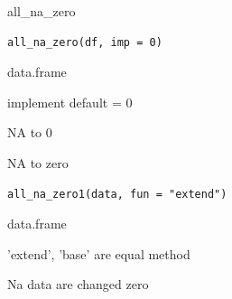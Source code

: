 \documentclass[a4paper]{book}
\begin{document}
%
\begin{Description}
all\_na\_zero
\end{Description}
%
\begin{Usage}
\begin{verbatim}
all_na_zero(df, imp = 0)
\end{verbatim}
\end{Usage}
%
\begin{Arguments}
\begin{ldescription}
\item[\code{df}] data.frame

\item[\code{imp}] implement default = 0
\end{ldescription}
\end{Arguments}
%
\begin{Value}
NA to 0
\end{Value}

%
\begin{Description}
NA to zero
\end{Description}
%
\begin{Usage}
\begin{verbatim}
all_na_zero1(data, fun = "extend")
\end{verbatim}
\end{Usage}
%
\begin{Arguments}
\begin{ldescription}
\item[\code{data}] data.frame

\item[\code{fun}] 'extend', 'base' are equal method
\end{ldescription}
\end{Arguments}
%
\begin{Value}
Na data are changed zero
\end{Value}
\end{document}
